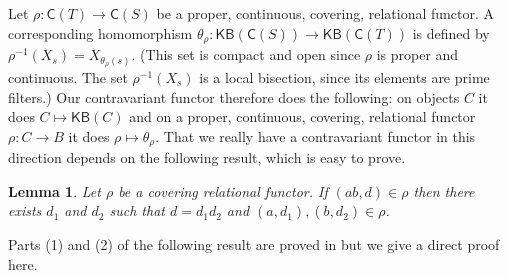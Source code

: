 \documentclass[a4paper]{amsart}
\newtheorem{lemma}[theorem]{Lemma}
\begin{document}
Let $\rho \colon \mathsf{C}(T) \rightarrow \mathsf{C}(S)$ be 
a proper, continuous, covering, relational functor.
A corresponding homomorphism $\theta_{\rho} \colon \mathsf{KB}(\mathsf{C}(S)) \rightarrow \mathsf{KB}(\mathsf{C}(T))$
is defined by
$\rho^{-1}(X_{s}) = X_{\theta_{\rho}(s)}$.
(This set is compact and open since $\rho$ is proper and continuous.
The set $\rho^{-1}(X_{s})$ is a local bisection,
since its elements are prime filters.)
Our contravariant functor therefore does the following: on objects $C$ it does $C \mapsto \mathsf{KB}(C)$
and on a proper, continuous, covering, relational functor
$\rho \colon C \rightarrow B$ it does $\rho \mapsto \theta_{\rho}$.
That we really have a contravariant functor in this direction  depends on the following result, which is easy to prove.


\begin{lemma} Let $\rho$ be a covering relational functor.
If $(ab,d) \in \rho$ then there exists $d_{1}$ and $d_{2}$ such that $d = d_{1}d_{2}$
and $(a,d_{1}),(b,d_{2}) \in \rho$.
\end{lemma}

Parts (1) and (2) of the following result are proved in \cite{KL} but we give a direct proof here.
\end{document}
